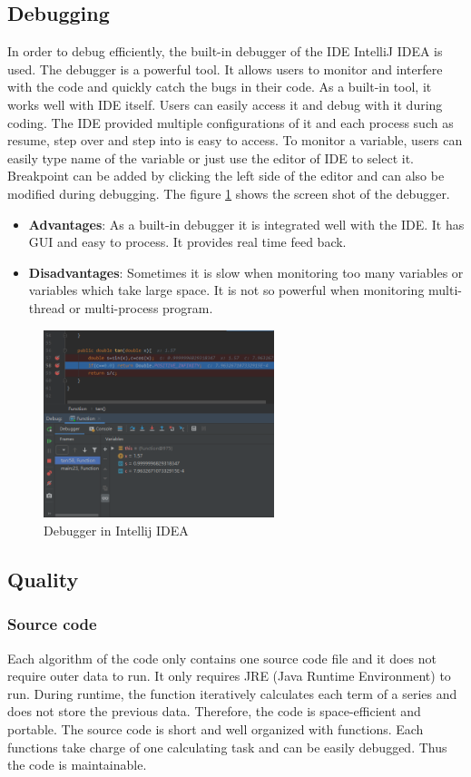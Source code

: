 \documentclass{article}
\begin{document}
\subsection{Debugging}
In order to debug efficiently, the built-in debugger of the IDE IntelliJ IDEA is used\cite{intellijideahelp}. The debugger is a powerful tool. It allows users to monitor and interfere with the code and quickly catch the bugs in their code. As a built-in tool, it works well with IDE itself. Users can easily access it and debug with it during coding. The IDE provided multiple configurations of it and each process such as resume, step over and step into is easy to access. To monitor a variable, users can easily type name of the variable or just use the editor of IDE to select it. Breakpoint can be added by clicking the left side of the editor and can also be modified during debugging. The figure \ref{Fig.debug} shows the screen shot of the debugger.
\begin{itemize}
    \item \textbf{Advantages}: As a built-in debugger it is integrated well with the IDE. It has GUI and easy to process. It provides real time feed back.
    \item \textbf{Disadvantages}: Sometimes it is slow when monitoring too many variables or variables which take large space. It is not so powerful when monitoring multi-thread or multi-process program.
\end{itemize}
\begin{figure}[H]
\centering
\includegraphics[width=0.6\textwidth]{debugger.png}
\caption{Debugger in Intellij IDEA}
\label{Fig.debug}
\end{figure}

\newpage
\subsection{Quality}
\subsubsection{Source code}
Each algorithm of the code only contains one source code file and it does not require outer data to run. It only requires JRE (Java Runtime Environment) to run. During runtime, the function iteratively calculates each term of a series and does not store the previous data. Therefore, the code is space-efficient and portable. The source code is short and well organized with functions. Each functions take charge of one calculating task and can be easily debugged. Thus the code is maintainable.
\end{document}
